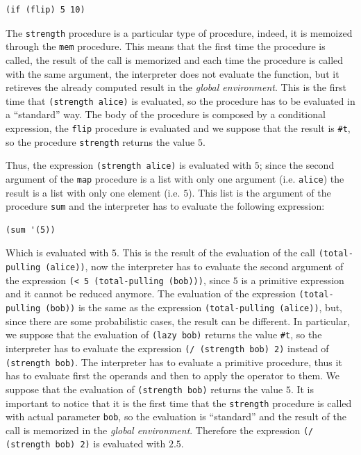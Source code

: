 \begin{itemize}
\begin{lstlisting}[caption={Body of procedure \texttt{strength} when evaluating Listing~\ref{lst:lambda-body}}, captionpos=b]
(if (flip) 5 10)
        \end{lstlisting}
        The \texttt{strength} procedure is a particular type of procedure, indeed, it is memoized through the \texttt{mem} procedure.
        This means that the first time the procedure is called, the result of the call is memorized and each time the procedure is
        called with the same argument, the interpreter does not evaluate the function, but it retireves the already computed
        result in the \textit{global environment}. This is the first time that \texttt{(strength \textquotesingle alice)} is evaluated, 
        so the procedure has to be evaluated in a ``standard'' way.
        The body of the procedure is composed by a conditional expression, the \texttt{flip} procedure is evaluated and we suppose
        that the result is \texttt{\#t}, so the procedure \texttt{strength} returns the value $5$.

        Thus, the expression \texttt{(strength \textquotesingle alice)} is evaluated with $5$; since the second argument of the \texttt{map} procedure
        is a list with only one argument (i.e. \texttt{\textquotesingle alice}) the result is a list with only one element (i.e. $5$).
        This list is the argument of the procedure \texttt{sum} and the interpreter has to evaluate the following expression:
        \begin{lstlisting}[caption={Expression to be evaluated after evaluating the expression in Listing~\ref{lst:map}}, captionpos=b]
(sum '(5))
        \end{lstlisting}
        Which is evaluated with $5$. This is the result of the evaluation of the call \texttt{(total-pulling \textquotesingle (alice))}, now the
        interpreter has to evaluate the second argument of the expression \texttt{(< 5 (total-pulling \textquotesingle (bob)))}, since $5$ is 
        a primitive expression and it cannot be reduced anymore.
        The evaluation of the expression \texttt{(total-pulling \textquotesingle (bob))} is the same as the expression 
        \texttt{(total-pulling \textquotesingle (alice))}, but, since there are some probabilistic cases, the result can be different. In particular,
        we suppose that the evaluation of \texttt{(lazy \textquotesingle bob)} returns the value \texttt{\#t}, so the interpreter has to evaluate the
        expression \texttt{(/ (strength \textquotesingle bob) 2)} instead of \texttt{(strength \textquotesingle bob)}. The interpreter has to evaluate a primitive
        procedure, thus it has to evaluate first the operands and then to apply the operator to them.
        We suppose that the evaluation of \texttt{(strength \textquotesingle bob)} returns the value $5$. It is important to notice that it is the
        first time that the \texttt{strength} procedure is called with actual parameter \texttt{\textquotesingle bob}, so the evaluation is
        ``standard'' and the result of the call is memorized in the \textit{global environment}. 
        Therefore the expression \texttt{(/ (strength \textquotesingle bob) 2)} is evaluated with $2.5$.


\end{itemize}
